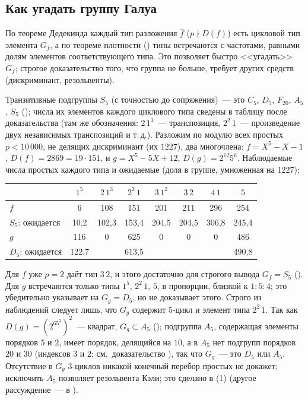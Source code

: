 \subsection*{Как угадать группу Галуа}

По теореме Дедекинда каждый тип разложения $\bar f$ ($p\nmid D(f)$) есть цикловой тип элемента $G_f$, а по теореме
плотности () типы встречаются с частотами, равными долям элементов соответствующего типа. Это позволяет быстро
<<угадать>> $G_f$; строгое доказательство того, что группа не больше, требует других средств (дискриминант, резольвенты).

\begin{example}[4.29c]
Транзитивные подгруппы $S_5$ (с точностью до сопряжения)~--- это $C_5$, $D_5$, $F_{20}$, $A_5$, $S_5$ (); числа их
элементов каждого циклового типа сведены в таблицу после доказательства  (там же обозначения: $2\,1^3$~---
транспозиция, $2^2\,1$~--- произведение двух независимых транспозиций и т.\,д.).
Разложим по модулю всех простых $p<10\,000$, не делящих дискриминант (их $1227$), два многочлена: $f=X^5-X-1$, $D(f)=2869=19\cdot151$, и
$g=X^5-5X+12$, $D(g)=2^{12}5^6$. Наблюдаемые числа простых каждого типа и ожидаемые (доля в группе, умноженная на 1227):
\begin{center}
\small
\begin{tabular}{lccccccc}
\toprule
 & $1^5$ & $2\,1^3$ & $2^2\,1$ & $3\,1^2$ & $3\,2$ & $4\,1$ & $5$\\
\midrule
$f$ & 6 & 108 & 151 & 201 & 211 & 296 & 254\\
$S_5$: ожидается & 10{,}2 & 102{,}3 & 153{,}4 & 204{,}5 & 204{,}5 & 306{,}8 & 245{,}4\\
\midrule
$g$ & 116 & 0 & 625 & 0 & 0 & 0 & 486\\
$D_5$: ожидается & 122{,}7 & & 613{,}5 & & & & 490{,}8\\
\bottomrule
\end{tabular}
\end{center}
Для $f$ уже $p=2$ даёт тип $3\,2$, и этого достаточно для строгого вывода $G_f=S_5$ (). Для $g$ встречаются только типы
$1^5$, $2^2\,1$, $5$, в пропорции, близкой к $1:5:4$; это убедительно указывает на $G_g=D_5$, но не доказывает этого.
Строго из наблюдений следует лишь, что $G_g$ содержит $5$-цикл и элемент типа $2^2\,1$. Так как $D(g)=(2^65^3)^2$~---
квадрат, $G_g\subset A_5$ (); подгруппа $A_5$, содержащая элементы порядков $5$ и $2$, имеет порядок, делящийся на
$10$, а в $A_5$ нет подгрупп порядков $20$ и $30$ (индексов $3$ и $2$; см.\ доказательство ), так что $G_g$~--- это $D_5$ или $A_5$. Отсутствие в $G_g$ $3$-циклов
никакой конечный перебор простых не докажет; исключить $A_5$ позволяет резольвента Кэли; это сделано в
(1) (другое рассуждение~--- в ).
\end{example}

